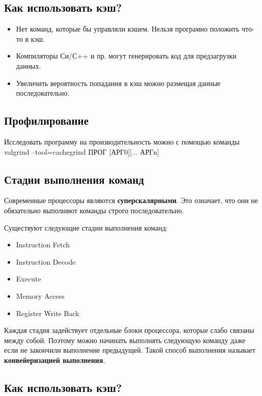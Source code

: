 \subsection{Как использовать кэш?}

\begin{itemize}
	\item Нет команд, которые бы управляли кэшем. Нельзя програмно положить 
	что-то в кэш.
	\item Компиляторы Си/С++ и пр. могут генерировать код для предзагрузки данных.
	\item Увеличить вероятность попадания в кэш можно размещая данные последовательно.
\end{itemize}

\subsection{Профилирование}

Исследовать программу на производительность можно с помощью команды 
valgrind --tool=cachegrind ПРОГ [АРГ0][... АРГn]

\subsection{Стадии выполнения команд}

Современные процессоры являются \textbf{суперскалярными}. Это означает, что они не обязательно
выполняют команды строго последовательно.

Существуют следующие стадии выполнения команд:
\begin{itemize}
	\item Instruction Fetch
	\item Instruction Decode
	\item Execute
	\item Memory Access
	\item Register Write Back 
\end{itemize}

Каждая стадия задействует отдельные блоки процессора, которые слабо связаны между собой. Поэтому можно начинать выполнять следующую команду даже если не закончили выполнение предыдущей. Такой способ выполнения называет \textbf{конвейеризацией выполнения}.

\subsection{Как использовать кэш?}

